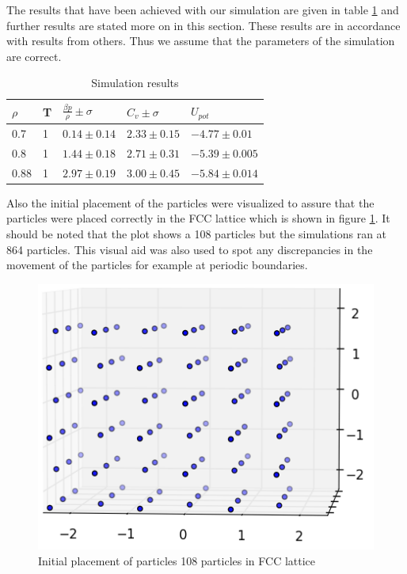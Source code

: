 \documentclass[12pt,a4paper]{report}
\begin{document}
The results that have been achieved with our simulation are given in table \ref{table:results} and further results are stated more on in this section. These results are in accordance with results from others. Thus we assume that the parameters of the simulation are correct.
\begin{table}[h]
\caption{Simulation results}\label{table:results}
\begin{center}
	\begin{tabular}{| l | l | l | l | l |}
	\hline
	$\rho$ & T &$ \frac{\beta p}{\rho} \pm \sigma $& $C_v \pm \sigma$ &$ U_{pot}$ \\
	\hline
	0.7  & 1 & $0.14 \pm 0.14$ & $2.33 \pm 0.15$ & $-4.77 \pm 0.01$  \\
	0.8  & 1 & $1.44 \pm 0.18$ & $2.71 \pm 0.31$ & $-5.39 \pm 0.005$ \\
	0.88 & 1 & $2.97 \pm 0.19$ & $3.00 \pm 0.45$ & $-5.84 \pm 0.014$ \\
	\hline
	\end{tabular}
\end{center}
\end{table}

Also the initial placement of the particles were visualized to assure that the particles were placed correctly in the FCC lattice which is shown in figure \ref{fig:init_place}. It should be noted that the plot shows a 108 particles but the simulations ran at 864 particles. This visual aid was also used to spot any discrepancies in the movement of the particles for example at periodic boundaries.

\begin{figure}[H]
\centering
\includegraphics[scale=0.5]{fcc.png}
\caption{Initial placement of particles 108 particles in FCC lattice }
\label{fig:init_place}
\end{figure}
\end{document}

